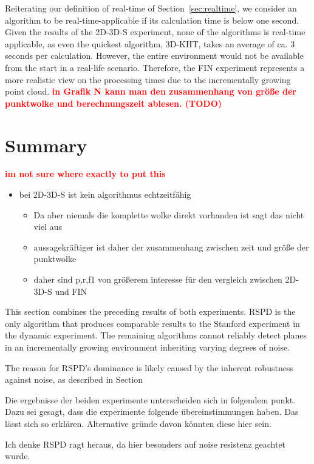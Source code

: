 \documentclass[main.tex]{subfiles}
\begin{document}
Reiterating our definition of real-time of Section~\ref{sec:realtime}, we consider an algorithm to be real-time-applicable if its calculation time is below one second.
Given the results of the 2D-3D-S experiment, none of the algorithms is real-time applicable, as even the quickest algorithm, 3D-KHT, takes
an average of ca. 3 seconds per calculation.
However, the entire environment would not be available from the start in a real-life scenario. Therefore, the FIN experiment represents a more realistic
view on the processing times due to the incrementally growing point cloud. \textbf{\textcolor{red}{in Grafik N kann man den zusammenhang
        von größe der punktwolke und berechnungszeit ablesen. (TODO)}}

\section{Summary}

\textbf{\textcolor{red}{im not sure where exactly to put this}}
\begin{itemize}
    \item bei 2D-3D-S ist kein algorithmus echtzeitfähig
          \begin{itemize}
              \item Da aber niemals die komplette wolke direkt vorhanden ist sagt das nicht viel aus
              \item aussagekräftiger ist daher der zusammenhang zwischen zeit und größe der punktwolke
              \item daher sind p,r,f1 von größerem interesse für den vergleich zwischen 2D-3D-S und FIN
          \end{itemize}
\end{itemize}


This section combines the preceding results of both experiments.
RSPD is the only algorithm that produces comparable results to the Stanford experiment in the dynamic experiment.
The remaining algorithms cannot reliably detect planes in an incrementally growing environment inheriting varying degrees of noise.

The reason for RSPD's dominance is likely caused by the inherent robustness against noise, as described in Section~

Die ergebnisse der beiden experimente unterscheiden sich in folgendem punkt. Dazu sei gesagt, dass die experimente folgende übereinstimmungen haben.
Das lässt sich so erklären. Alternative gründe davon könnten diese hier sein.

Ich denke RSPD ragt heraus, da hier besonders auf noise resistenz geachtet wurde. %
\end{document}
